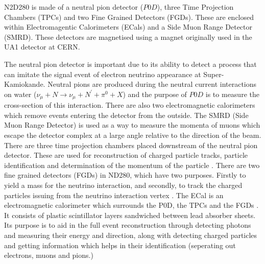N2D280 is made of a neutral pion detector ($P0D$), three Time Projection Chambers (TPCs) and two Fine Grained Detectors (FGDs). These are enclosed within Electromagentic Calorimeters (ECals) and a Side Muon Range Detector (SMRD). These detectors are magnetised using a magnet originally used in the UA1 detector at CERN. 

The neutral pion detector is important due to its ability to detect a process that can imitate the signal event of electron neutrino appearance at Super-Kamiokande. Neutral pions are produced during the neutral current interactions on water ($\nu_{\mu} + N \rightarrow \nu_{\mu} + N^{'} +\pi^{0} + X$) and the purpose of $P0D$ is to measure the cross-section of this interaction. 
\newline 
 There are also two electromagnetic calorimeters which remove events entering the detector from the outside. The SMRD (Side Muon Range Detector) is used as a way to measure the momenta of muons which escape the detector complex at a large angle relative to the direction of the beam. 
\newline
There are three time projection chambers placed downstream of the neutral pion detector. These are used for reconstruction of charged particle tracks, particle identification and determination of the momentum of the particle \cite{abgrall2011time}. There are two fine grained detectors (FGDs) in ND280, which have two purposes. Firstly to yield a mass for the neutrino interaction, and secondly, to track the charged particles issuing from the neutrino interaction vertex \cite{amaudruz2012t2k}.
\newline
The ECal is an electromagnetic calorimeter which surrounds the P0D, the TPCs and the FGDs \cite{allan2013electromagnetic}. It consists of plastic scintillator layers sandwiched between lead absorber sheets. Its purpose is to aid in the full event reconstruction through detecting photons and measuring their energy and direction, along with detecting charged particles and getting information which helps in their identification (seperating out electrons, muons and pions.)
